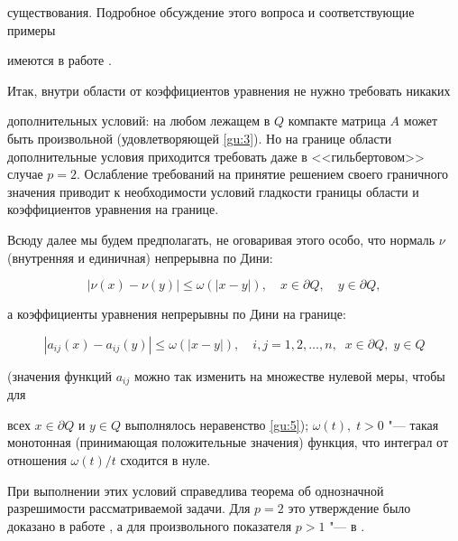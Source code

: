 существования. Подробное обсуждение этого вопроса и соответствующие примеры

имеются в работе \cite{MSB12}. 

Итак, внутри области от коэффициентов уравнения не нужно требовать никаких

дополнительных условий: на любом лежащем в $Q$ компакте матрица $A$ может быть произвольной (удовлетворяющей \eqref{gu:3}). Но на границе области дополнительные условия приходится требовать даже в <<гильбертовом>> случае $p = 2$. Ослабление требований на принятие решением своего граничного значения приводит к необходимости условий гладкости границы области и коэффициентов уравнения на границе. 

Всюду далее мы будем предполагать, не оговаривая этого особо, что нормаль $\nu$ (внутренняя и единичная) непрерывна по Дини:

\begin{equation}

|\nu (x) -\nu (y)| \le \omega (|x -y|),\quad x\in\partial Q,\quad y\in\partial Q, 

\label{gu:4}

\end{equation}

а коэффициенты уравнения непрерывны по Дини на границе:

\begin{equation}

| a_{ij} (x) - a_{ij} (y)|\le \omega (|x -y|),\quad i, j=1, 2, \ldots, n,\; \; x\in\partial Q,\; y\in Q 

\label{gu:5}

\end{equation}

(значения функций $a_{ij}$ можно так изменить на множестве нулевой меры, чтобы для

всех $x \in \partial Q$ и $y \in Q$ выполнялось неравенство \eqref{gu:5}); $\omega(t), \; t > 0$ "--- такая монотонная (принимающая положительные значения) функция, что интеграл от отношения ${\omega (t)}/{t}$ сходится в нуле.



При выполнении этих условий справедлива теорема об однозначной разрешимости рассматриваемой задачи. Для $p = 2$ это утверждение было доказано в работе \cite{G88}, а для произвольного показателя $p > 1$ "--- в \cite{MSB12}. 



\smallskip



